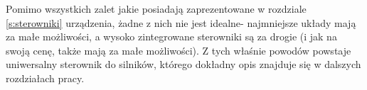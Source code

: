 Pomimo wszystkich zalet jakie posiadają zaprezentowane w rozdziale \ref{s:sterowniki} urządzenia, żadne z nich nie jest idealne- najmniejsze układy mają za małe możliwości, a wysoko zintegrowane sterowniki są za drogie (i jak na swoją cenę, także mają za małe możliwości). Z tych właśnie powodów powstaje uniwersalny sterownik do silników, którego dokładny opis znajduje się w dalszych rozdziałach pracy.







\clearpage


